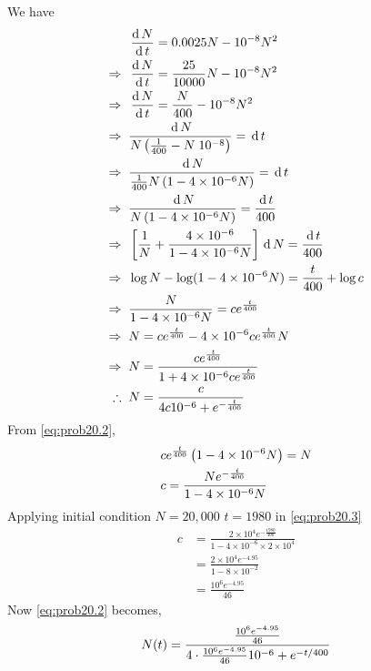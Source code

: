 \documentclass[../main-sheet.tex]{subfiles}
\begin{document}
\begin{soln}
    We have
    \begin{align}
        &\,\frac{\mathrm{d}\,N}{\mathrm{d}\,t}=0.0025N-10^{-8}N^2\notag\\
        \Rightarrow\;\;&\,\frac{\mathrm{d}\,N}{\mathrm{d}\,t}=\frac{25}{10000}N-10^{-8}N^2\notag\\
        \Rightarrow\;\;&\,\frac{\mathrm{d}\,N}{\mathrm{d}\,t}=\frac{N}{400}-10^{-8}N^2\notag\\
        \Rightarrow\;\;&\frac{\,\mathrm{d}\, N}{N\left( \frac{1}{400}-N\;10^{-8} \right)}=\,\mathrm{d}\, t\notag\\
        \Rightarrow\;\;&\frac{\,\mathrm{d}\, N}{\frac{1}{400}N\left( 1-4\times 10^{-6}N \right)}=\,\mathrm{d}\, t\notag\\
        \Rightarrow\;\;&\frac{\,\mathrm{d}\, N}{N\left( 1-4\times 10^{-6}N \right)}=\frac{\,\mathrm{d}\, t}{400}\notag\\
        \Rightarrow\;\;&\left[ \frac{1}{N}+\frac{4\times 10^{-6}}{1-4\times 10^{-6}N} \right] \,\mathrm{d}\, N=\frac{\,\mathrm{d}\, t}{400}\notag\\
        \Rightarrow\;\;&\log{N}-\log({1-4\times 10^{-6}N})=\frac{t}{400}+\log c\notag\\
        \Rightarrow\;\;&\frac{N}{1-4\times 10^{-6}N}=ce^{\frac{t}{400}}\notag\\
        \Rightarrow\;\;&{N}=ce^{\frac{t}{400}}-4\times 10^{-6}ce^{\frac{t}{400}} N\label{eq:prob:20.1}\\
        \Rightarrow\;\;&{N}=\frac{ce^{\frac{t}{400}}}{1+4\times 10^{-6}ce^{\frac{t}{400}}}\notag\\
        \therefore\;\;&{N}=\frac{c}{4c10^{-6}+e^{-\frac{t}{400}}}\label{eq:prob20.2}
    \end{align}
    From \eqref{eq:prob20.2},
    \begin{align}
        & ce^{\frac{t}{400}}\left( 1-4\times10^{-6}N \right)=N\notag\\
        & c=\frac{Ne^{-\frac{t}{400}}}{1-4\times10^{-6}N}\label{eq:prob20.3}
    \end{align}
    Applying initial condition \(N=20,000\) \(t=1980\) in \eqref{eq:prob20.3}
    \begin{align*}
        c&=\frac{2\times 10^4 e^{-\frac{1980}{400}}}{1-4\times10^{-6}\times 2\times 10^4}\\
        &=\frac{2\times 10^4 e^{-4.95}}{1-8\times10^{-2}}\\
        &=\frac{10^6 e^{-4.95}}{46}
    \end{align*}
    Now \eqref{eq:prob20.2} becomes,
    \begin{align}
        N(t)&=\frac{\frac{10^6 e^{-4.95}}{46}}{4\cdot \frac{10^6 e^{-4.95}}{46}10^{-6}+e^{-t/400}}\notag\\

\end{align}
\end{soln}
\end{document}
